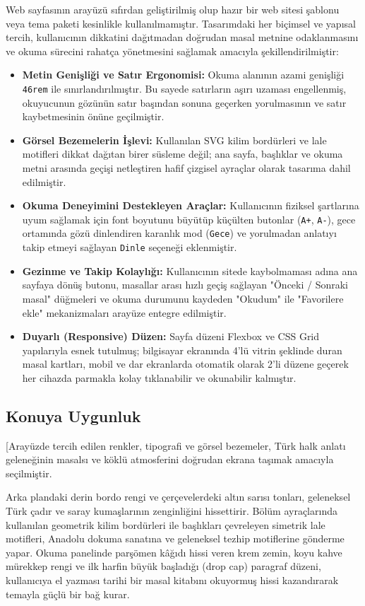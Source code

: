\documentclass[12pt,a4paper]{article}
\begin{document}
Web sayfasının arayüzü sıfırdan geliştirilmiş olup hazır bir web sitesi şablonu veya tema paketi kesinlikle kullanılmamıştır. Tasarımdaki her biçimsel ve yapısal tercih, kullanıcının dikkatini dağıtmadan doğrudan masal metnine odaklanmasını ve okuma sürecini rahatça yönetmesini sağlamak amacıyla şekillendirilmiştir: 

\begin{itemize}
    \item \textbf{Metin Genişliği ve Satır Ergonomisi:} Okuma alanının azami genişliği \verb|46rem| ile sınırlandırılmıştır. Bu sayede satırların aşırı uzaması engellenmiş, okuyucunun gözünün satır başından sonuna geçerken yorulmasının ve satır kaybetmesinin önüne geçilmiştir. 
    \item \textbf{Görsel Bezemelerin İşlevi:} Kullanılan SVG kilim bordürleri ve lale motifleri dikkat dağıtan birer süsleme değil; ana sayfa, başlıklar ve okuma metni arasında geçişi netleştiren hafif çizgisel ayraçlar olarak tasarıma dahil edilmiştir. 
    \item \textbf{Okuma Deneyimini Destekleyen Araçlar:} Kullanıcının fiziksel şartlarına uyum sağlamak için font boyutunu büyütüp küçülten butonlar (\verb|A+|, \verb|A-|), gece ortamında gözü dinlendiren karanlık mod (\verb|Gece|) ve yorulmadan anlatıyı takip etmeyi sağlayan \verb|Dinle| seçeneği eklenmiştir. 
    \item \textbf{Gezinme ve Takip Kolaylığı:} Kullanıcının sitede kaybolmaması adına ana sayfaya dönüş butonu, masallar arası hızlı geçiş sağlayan "Önceki / Sonraki masal" düğmeleri ve okuma durumunu kaydeden "Okudum" ile "Favorilere ekle" mekanizmaları arayüze entegre edilmiştir. 
    \item \textbf{Duyarlı (Responsive) Düzen:} Sayfa düzeni Flexbox ve CSS Grid yapılarıyla esnek tutulmuş; bilgisayar ekranında 4'lü vitrin şeklinde duran masal kartları, mobil ve dar ekranlarda otomatik olarak 2'li düzene geçerek her cihazda parmakla kolay tıklanabilir ve okunabilir kalmıştır.
\end{itemize}



\subsection{Konuya Uygunluk}
[Arayüzde tercih edilen renkler, tipografi ve görsel bezemeler, Türk halk anlatı geleneğinin masalsı ve köklü atmosferini doğrudan ekrana taşımak amacıyla seçilmiştir.

Arka plandaki derin bordo rengi ve çerçevelerdeki altın sarısı tonları, geleneksel Türk çadır ve saray kumaşlarının zenginliğini hissettirir. Bölüm ayraçlarında kullanılan geometrik kilim bordürleri ile başlıkları çevreleyen simetrik lale motifleri, Anadolu dokuma sanatına ve geleneksel tezhip motiflerine gönderme yapar. Okuma panelinde parşömen kâğıdı hissi veren krem zemin, koyu kahve mürekkep rengi ve ilk harfin büyük başladığı (drop cap) paragraf düzeni, kullanıcıya el yazması tarihi bir masal kitabını okuyormuş hissi kazandırarak temayla güçlü bir bağ kurar. 
\end{document}
